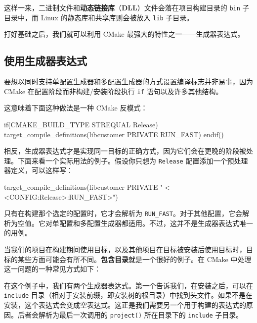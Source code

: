 \label{idx:669}
这样一来，二进制文件和\textbf{动态链接库}（\textbf{DLL}）文件会落在项目构建目录的 \texttt{bin} 子目录中，而 Linux 的静态库和共享库则会被放入 \texttt{lib} 子目录。

打好基础之后，我们就可以利用 CMake 最强大的特性之一——生成器表达式。

\subsection{使用生成器表达式}

\label{idx:670}
要想以同时支持单配置生成器和多配置生成器的方式设置编译标志并非易事，因为 CMake 在配置阶段而非构建/安装阶段执行 \texttt{if} 语句以及许多其他结构。

这意味着下面这种做法是一种 CMake 反模式：

\begin{codebox}[cmake]
if(CMAKE_BUILD_TYPE STREQUAL Release)
  target_compile_definitions(libcustomer PRIVATE RUN_FAST)
endif()
\end{codebox}

相反，生成器表达式才是实现同一目标的正确方式，因为它们会在更晚的阶段被处理。下面来看一个实际用法的例子。假设你只想为 \texttt{Release} 配置添加一个预处理器定义，可以这样写：

\begin{codebox}[cmake]
target_compile_definitions(libcustomer PRIVATE "$<$<CONFIG:Release>:RUN_FAST>")
\end{codebox}

只有在构建那个选定的配置时，它才会解析为 \texttt{RUN\_FAST}。对于其他配置，它会解析为空值。它对单配置和多配置生成器都适用。不过，这并不是生成器表达式唯一的用例。

\label{idx:671}
当我们的项目在构建期间使用目标，以及其他项目在目标被安装后使用目标时，目标的某些方面可能会有所不同。\textbf{包含目录}就是一个很好的例子。在 CMake 中处理这一问题的一种常见方式如下：


\label{idx:672}
在这个例子中，我们有两个生成器表达式。第一个告诉我们，在安装之后，可以在 \texttt{include} 目录（相对于安装前缀，即安装树的根目录）中找到头文件。如果不是在安装，这个表达式会变成空表达式。这正是我们需要另一个用于构建的表达式的原因。后者会解析为最后一次调用的 \texttt{project()} 所在目录下的 \texttt{include} 子目录。

